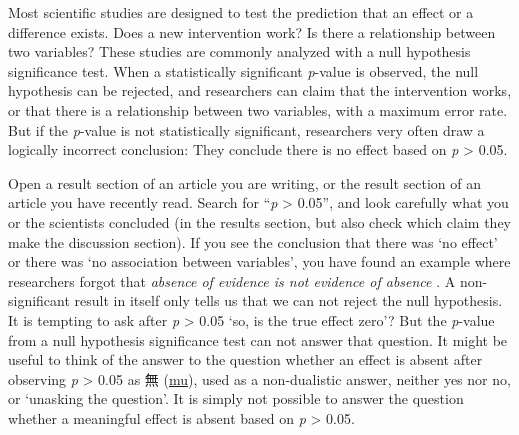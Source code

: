 \documentclass[
  oneside]{book}
\begin{document}
Most scientific studies are designed to test the prediction that an effect or a difference exists. Does a new intervention work? Is there a relationship between two variables? These studies are commonly analyzed with a null hypothesis significance test. When a statistically significant \emph{p}-value is observed, the null hypothesis can be rejected, and researchers can claim that the intervention works, or that there is a relationship between two variables, with a maximum error rate. But if the \emph{p}-value is not statistically significant, researchers very often draw a logically incorrect conclusion: They conclude there is no effect based on \emph{p} \textgreater{} 0.05.

Open a result section of an article you are writing, or the result section of an article you have recently read. Search for ``\emph{p} \textgreater{} 0.05'', and look carefully what you or the scientists concluded (in the results section, but also check which claim they make the discussion section). If you see the conclusion that there was `no effect' or there was `no association between variables', you have found an example where researchers forgot that \emph{absence of evidence is not evidence of absence} \citep{altman_statistics_1995}. A non-significant result in itself only tells us that we can not reject the null hypothesis. It is tempting to ask after \emph{p} \textgreater{} 0.05 `so, is the true effect zero'? But the \emph{p}-value from a null hypothesis significance test can not answer that question. It might be useful to think of the answer to the question whether an effect is absent after observing \emph{p} \textgreater{} 0.05 as 無 (\href{https://en.wikipedia.org/wiki/Mu_(negative)\#Non-dualistic_meaning}{mu}), used as a non-dualistic answer, neither yes nor no, or `unasking the question'. It is simply not possible to answer the question whether a meaningful effect is absent based on \emph{p} \textgreater{} 0.05.
\end{document}
